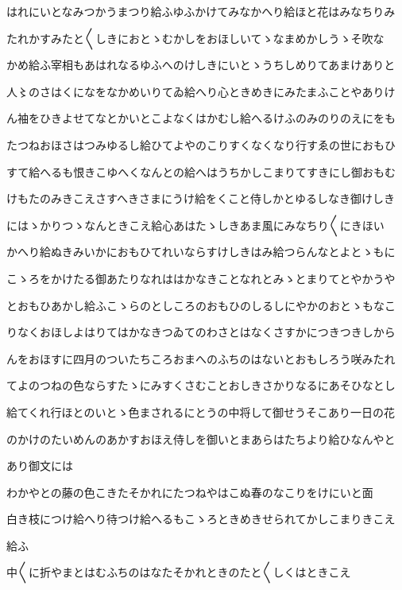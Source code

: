 \documentclass[a4paper,11pt,landscape]{ltjtarticle}
\begin{document}
\par\medskip
はれにいとなみつかうまつり給ふゆふかけてみなかへり給ほと花はみなちりみ
\par\medskip
たれかすみたと〱しきにおとゝむかしをおほしいてゝなまめかしうゝそ吹な
\par\medskip
かめ給ふ宰相もあはれなるゆふへのけしきにいとゝうちしめりてあまけありと
\par\medskip
人〻のさはくになをなかめいりてゐ給へり心ときめきにみたまふことやありけ
\par\medskip
ん袖をひきよせてなとかいとこよなくはかむし給へるけふのみのりのえにをも
\par\medskip
たつねおほさはつみゆるし給ひてよやのこりすくなくなり行すゑの世におもひ
\par\medskip
すて給へるも恨きこゆへくなんとの給へはうちかしこまりてすきにし御おもむ
\par\medskip
けもたのみきこえさすへきさまにうけ給をくこと侍しかとゆるしなき御けしき
\par\medskip
にはゝかりつゝなんときこえ給心あはたゝしきあま風にみなちり〱にきほい
\par\medskip
かへり給ぬきみいかにおもひてれいならすけしきはみ給つらんなとよとゝもに
\par\medskip
こゝろをかけたる御あたりなれははかなきことなれとみゝとまりてとやかうや
\par\medskip
とおもひあかし給ふこゝらのとしころのおもひのしるしにやかのおとゝもなこ
\par\medskip
りなくおほしよはりてはかなきつゐてのわさとはなくさすかにつきつきしから
\par\medskip
んをおほすに四月のついたちころおまへのふちのはないとおもしろう咲みたれ
\par\medskip
てよのつねの色ならすたゝにみすくさむことおしきさかりなるにあそひなとし
\par\medskip
給てくれ行ほとのいとゝ色まされるにとうの中将して御せうそこあり一日の花
\par\medskip
のかけのたいめんのあかすおほえ侍しを御いとまあらはたちより給ひなんやと
\par\medskip
あり御文には
\par\medskip
わかやとの藤の色こきたそかれにたつねやはこぬ春のなこりをけにいと面
\par\medskip
白き枝につけ給へり待つけ給へるもこゝろときめきせられてかしこまりきこえ
\par\medskip
給ふ
\par\medskip
中〱に折やまとはむふちのはなたそかれときのたと〱しくはときこえ
\par\medskip
\end{document}
